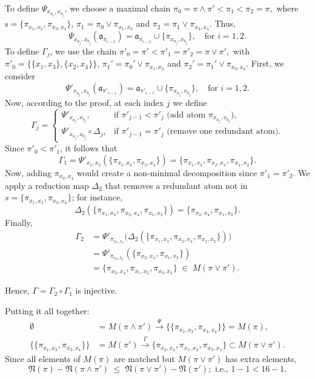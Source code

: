 \documentclass[12pt]{extarticle}
\begin{document}
To define \( \Psi_{x_{a_j},x_{b_j}}\), we choose a maximal chain 
\(
\pi_0 = \pi \wedge \pi' < \pi_1 < \pi_2 = \pi,\)
where
\(
\textrm{s}=\{\pi_{x_1,x_2}, \pi_{x_3,x_4}\}\),
\(\pi_1 = \pi_{0} \vee \pi_{x_1,x_2}\) and 
\(\pi_2 = \pi_{1} \vee \pi_{x_3,x_4}
\). Thus,
\[
\Psi_{x_{a_j},x_{b_j}}(\mathfrak{a}_{\pi_{i-1}}) = \mathfrak{a}_{\pi_{i-1}} \cup \{\pi_{x_{a_j},x_{b_j}}\}, 
\quad \text{for } i = 1,2.
\]
To define \( \Gamma_j \), we use the chain
\(
\pi'_0 = \pi' < \pi'_1 = \pi'_2 = \pi \vee \pi',
\)
with
\(
\pi'_0 = \{\{x_1,x_3\},\{x_2,x_4\}\}\), 
\(
\pi_1' = \pi_{0}' \vee \pi_{x_1,x_2}\) and 
\(
\pi_2' = \pi_{1}' \vee \pi_{x_3,x_4}
\).
First, we consider
\[
\Psi'_{x_{a_j},x_{b_j}}(\mathfrak{a}_{\pi'_{i-1}}) = \mathfrak{a}_{\pi'_{i-1}} \cup \{\pi_{x_{a_j},x_{b_j}}\}, 
\quad \text{for } i = 1,2.
\]
Now, according to the proof, at each index \(j\) we define 
\[
\Gamma_{j} =
\begin{cases}
\Psi'_{x_{a_j},x_{b_j}}, 
&\text{if }\pi'_{j-1} < \pi'_{j} \text{ (add atom }\pi_{x_{a_j},x_{b_j}}\!), \\[6pt]
\Psi'_{x_{a_j},x_{b_j}} \circ\Delta_{j}, 
&\text{if }\pi'_{j-1} = \pi'_{j} \text{ (remove one redundant atom).}
\end{cases}
\]
Since \(\pi'_0<\pi'_1\), it follows that 
\[
\Gamma_1 = \Psi'_{x_1,x_2}(\{\pi_{x_1,x_3}, \pi_{x_2,x_4}\}) 
= \{\pi_{x_1,x_3}, \pi_{x_2,x_4}, \pi_{x_1,x_2}\}.
\]
Now, adding \(\pi_{x_3,x_4}\) would create a non-minimal decomposition since \(\pi'_1=\pi'_2\). We apply a reduction map \(\Delta_2\) that removes a redundant atom not in \(s=\{\pi_{x_1,x_2},\pi_{x_3,x_4}\}\); for instance,
\[
\Delta_2(\{\pi_{x_1,x_3}, \pi_{x_2,x_4}, \pi_{x_1,x_2}\}) 
= \{\pi_{x_2,x_4}, \pi_{x_1,x_2}\}.
\]
Finally,
\[\begin{aligned}
\Gamma_2
&= \Psi'_{\pi_{x_3,x_4}}\bigl(\Delta_2(\{\pi_{x_1,x_3}, \pi_{x_2,x_4}, \pi_{x_1,x_2}\})\bigr)\\
&= \Psi'_{\pi_{x_3,x_4}}(\{\pi_{x_2,x_4}, \pi_{x_1,x_2}\})\\
&= \{\pi_{x_2,x_4}, \pi_{x_1,x_2}, \pi_{x_3,x_4}\}
\;\in\;M(\pi \vee \pi').
\end{aligned}\]

Hence, \(\Gamma=\Gamma_2\circ\Gamma_1\) is injective.

Putting it all together:
\[\begin{aligned}
\emptyset &= M(\pi \wedge \pi') 
\xrightarrow{\Psi} 
\bigl\{\{\pi_{x_1,x_2},\pi_{x_3,x_4}\}\bigr\} = M(\pi),\\
\{\{\pi_{x_1,x_3},\pi_{x_2,x_4}\}\} &= M(\pi') 
\xrightarrow{\Gamma} 
\{\pi_{x_2,x_4},\pi_{x_1,x_2},\pi_{x_3,x_4}\} \subset M(\pi \vee \pi').
\end{aligned}\]
Since all elements of \(M(\pi)\) are matched but \(M(\pi \vee \pi')\) has extra elements,
\[
\mathfrak{N}(\pi) - \mathfrak{N}(\pi \wedge \pi') \;\le\; \mathfrak{N}(\pi \vee \pi') - \mathfrak{N}(\pi'); \text{ i.e., }  1-1 < 16-1.
\]
	
\end{document}
